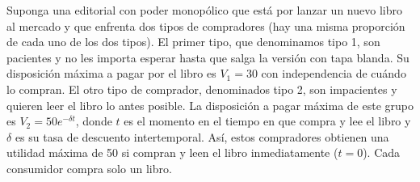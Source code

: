 \question Suponga una editorial con poder monopólico que está por lanzar un nuevo libro al mercado y que enfrenta dos tipos de compradores (hay una misma proporción de cada uno de los dos tipos). El primer tipo, que denominamos tipo 1, son pacientes y no les importa esperar hasta que salga la versión con tapa blanda. Su disposición máxima a pagar por el libro es $V_1 = 30$ con independencia de cuándo lo compran. El otro tipo de comprador, denominados tipo 2, son impacientes y quieren leer el libro lo antes posible. La disposición a pagar máxima de este grupo es $V_2 = 50e^{-\delta t}$, donde $t$ es el momento en el tiempo en que compra y lee el libro y $\delta$ es su tasa de descuento intertemporal. Así, estos compradores obtienen una utilidad máxima de 50 si compran y leen el libro inmediatamente ($t=0$). Cada consumidor compra solo un libro.

